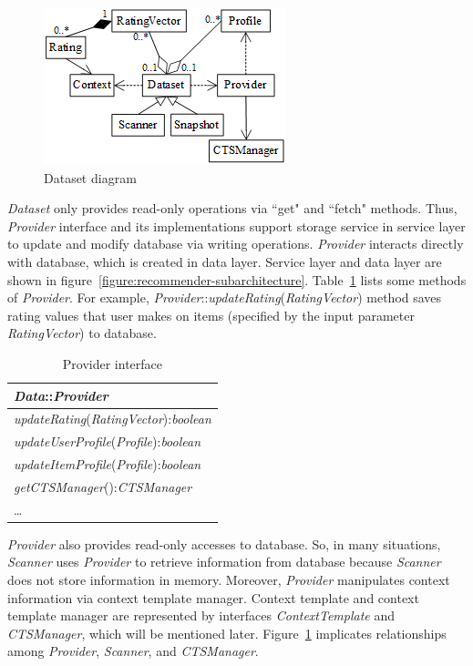\documentclass[a4paper,twoside]{article}
\begin{document}
\begin{figure}
\centering
\includegraphics{DatasetDiagram.png}
\caption{Dataset diagram}
\label{figure:dataset-diagram}
\end{figure}

\textit{Dataset} only provides read-only operations via ``get" and ``fetch" methods. Thus, \textit{Provider} interface and its implementations support storage service in service layer to update and modify database via writing operations. \textit{Provider} interacts directly with database, which is created in data layer. Service layer and data layer are shown in figure~\ref{figure:recommender-subarchitecture}. Table~\ref{table:provider} lists some methods of \textit{Provider}. For example, \textit{Provider}::\textit{updateRating}(\textit{RatingVector}) method saves rating values that user makes on items (specified by the input parameter \textit{RatingVector}) to database.
\begin{table}
\centering
\caption{Provider interface}
\label{table:provider}
\begin{tabular}{|l|} \hline
\textit{Data}::\textit{Provider} \\ \hline
\textit{updateRating}(\textit{RatingVector}):\textit{boolean} \\
\textit{updateUserProfile}(\textit{Profile}):\textit{boolean} \\
\textit{updateItemProfile}(\textit{Profile}):\textit{boolean} \\
\textit{getCTSManager}():\textit{CTSManager} \\
\ldots \\ \hline
\end{tabular}
\end{table}

\textit{Provider} also provides read-only accesses to database. So, in many situations, \textit{Scanner} uses \textit{Provider} to retrieve information from database because \textit{Scanner} does not store information in memory. Moreover, \textit{Provider} manipulates context information via context template manager. Context template and context template manager are represented by interfaces \textit{ContextTemplate} and \textit{CTSManager}, which will be mentioned later. Figure~\ref{figure:dataset-diagram} implicates relationships among \textit{Provider}, \textit{Scanner}, and \textit{CTSManager}. 
\end{document}
